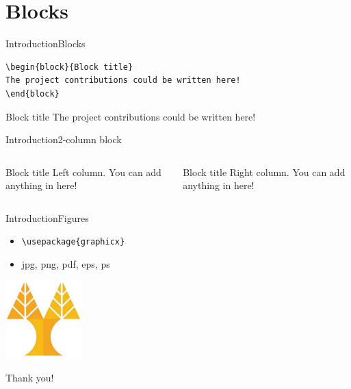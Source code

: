\documentclass[hyperref={pdfpagelabels=false}]{beamer}
\begin{document}
\part{Blocks}
\frame{\partpage}

\begin{frame}[fragile]{Introduction}{Blocks}
\begin{verbatim}
\begin{block}{Block title}
The project contributions could be written here!
\end{block}
\end{verbatim}
\begin{block}{Block title}
The project contributions could be written here!
\end{block}
\end{frame}
%

\begin{frame}[fragile]{Introduction}{2-column block}
\begin{columns}
\begin{block}{Block title}
Left column. You can add anything in here!
\end{block}
\begin{block}{Block title}
Right column. You can add anything in here!
\end{block}
\end{columns}
\end{frame}

\begin{frame}[fragile]{Introduction}{Figures}
\begin{itemize}
	\item \verb+\usepackage{graphicx}+
	\item jpg, png, pdf, eps, ps
\end{itemize}
\includegraphics[height=3cm]{./figures/ucylogo.pdf}
\end{frame}

\begin{frame}
    \begin{center}
      Thank you!
    \end{center}
  \end{frame}
	
\end{document}

